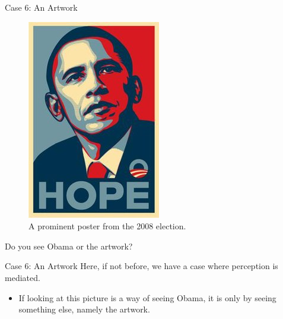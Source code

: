 \documentclass[
  17pt,
  letterpaper,
  ignorenonframetext,
  aspectratio=169,
]{beamer}
\providecommand{\tightlist}{%
  \setlength{\itemsep}{0pt}\setlength{\parskip}{0pt}}\usepackage{longtable,booktabs,array}
\begin{document}
\begin{frame}{Case 6: An Artwork}
\protect\hypertarget{case-6-an-artwork}{}
\begin{figure}

{\centering \includegraphics[width=\textwidth,height=0.5\textheight]{../images/obama.jpg}

}

\caption{A prominent poster from the 2008 election.}

\end{figure}

Do you see Obama or the artwork?
\end{frame}

\begin{frame}{Case 6: An Artwork}
\protect\hypertarget{case-6-an-artwork-1}{}
Here, if not before, we have a case where perception is mediated.

\begin{itemize}[<+->]
\tightlist
\item
  If looking at this picture is a way of seeing Obama, it is only by
  seeing something else, namely the artwork.
\end{itemize}
\end{frame}
\end{document}
